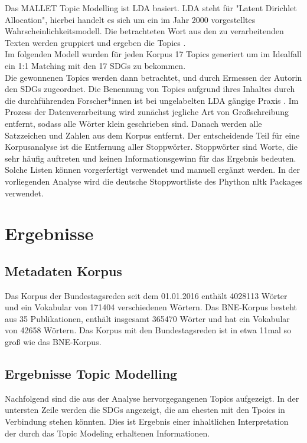 \documentclass[letterpaper]{article}
\begin{document}
Das MALLET Topic Modelling ist LDA basiert. LDA steht für "Latent Dirichlet Allocation", hierbei handelt es sich um ein im Jahr 2000 vorgestelltes Wahrscheinlichkeitsmodell. Die betrachteten Wort aus den zu verarbeitenden Texten werden gruppiert und ergeben die Topics \cite{LDA}.\\
Im folgenden Modell wurden für jeden Korpus 17 Topics generiert um im Idealfall ein 1:1 Matching mit den 17 SDGs zu bekommen.\\
Die gewonnenen Topics werden dann betrachtet, und durch Ermessen der Autorin den SDGs zugeordnet. Die Benennung von Topics aufgrund ihres Inhaltes durch die durchführenden Forscher*innen ist bei ungelabelten LDA gängige Praxis \cite{Raman}.
Im Prozess der Datenverarbeitung wird zunächst jegliche Art von Großschreibung entfernt, sodass alle Wörter klein geschrieben sind. Danach werden alle Satzzeichen und Zahlen aus dem Korpus entfernt. Der entscheidende Teil für eine Korpusanalyse ist die Entfernung aller Stoppwörter. Stoppwörter sind Worte, die sehr häufig auftreten und keinen Informationsgewinn für das Ergebnis bedeuten. Solche Listen können vorgerfertigt verwendet und manuell ergänzt werden. In der vorliegenden Analyse wird die deutsche Stoppwortliste des Phython nltk Packages verwendet. 
\clearpage

\section{Ergebnisse}
\subsection{Metadaten Korpus}
Das Korpus der Bundestagsreden seit dem 01.01.2016 enthält 4028113 Wörter und ein Vokabular von 171404 verschiedenen Wörtern. Das BNE-Korpus besteht aus 35 Publikationen, enthält insgesamt 365470 Wörter und hat ein Vokabular von 42658 Wörtern. Das Korpus mit den Bundestagsreden ist in etwa 11mal so groß wie das BNE-Korpus. 

\subsection{Ergebnisse Topic Modelling} 
Nachfolgend sind die aus der Analyse hervorgegangenen Topics aufgezeigt. In der untersten Zeile werden die SDGs angezeigt, die am ehesten mit den Tpoics in Verbindung stehen könnten. Dies ist Ergebnis einer inhaltlichen Interpretation der durch das Topic Modeling erhaltenen Informationen.\\
\end{document}
